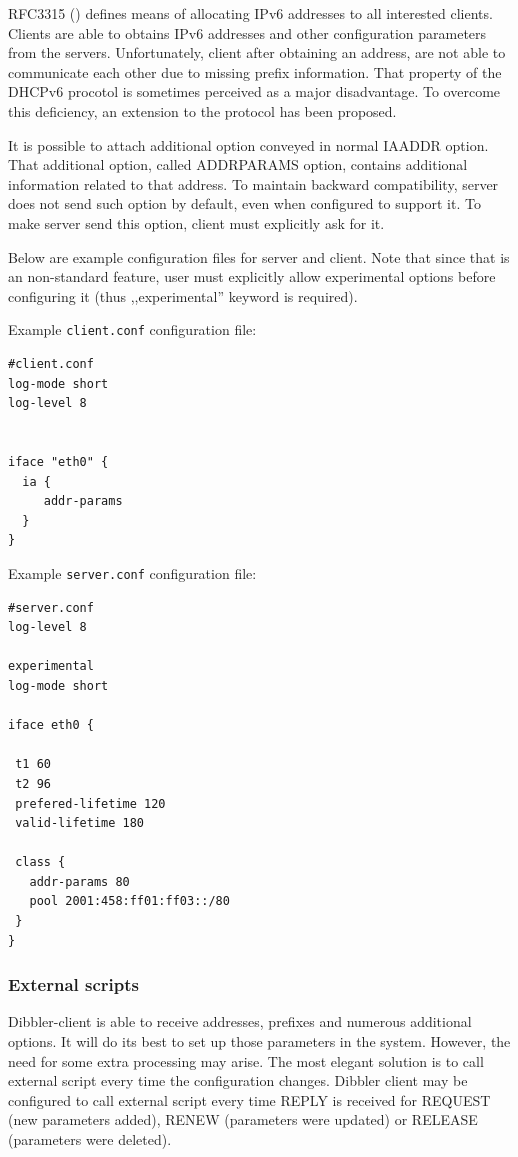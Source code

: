 RFC3315 (\cite{rfc3315}) defines means of allocating IPv6 addresses to
all interested clients. Clients are able to obtains IPv6 addresses and
other configuration parameters from the servers. Unfortunately, client
after obtaining an address, are not able to communicate each other due
to missing prefix information. That property of the DHCPv6 procotol is
sometimes perceived as a major disadvantage. To overcome this
deficiency, an extension to the protocol has been proposed.

It is possible to attach additional option conveyed in normal IAADDR
option. That additional option, called ADDRPARAMS option, contains
additional information related to that address. To maintain backward
compatibility, server does not send such option by default, even when
configured to support it. To make server send this option, client must
explicitly ask for it. 

Below are example configuration files for server and client. Note that
since that is an non-standard feature, user must explicitly allow
experimental options before configuring it (thus ,,experimental''
keyword is required).

Example \verb+client.conf+ configuration file:

\begin{lstlisting}
#client.conf
log-mode short
log-level 8


iface "eth0" {
  ia { 
     addr-params 
  }
}
\end{lstlisting}

Example \verb+server.conf+ configuration file:

\begin{lstlisting}
#server.conf
log-level 8

experimental
log-mode short

iface eth0 {

 t1 60
 t2 96
 prefered-lifetime 120
 valid-lifetime 180

 class {
   addr-params 80
   pool 2001:458:ff01:ff03::/80
 }
}
\end{lstlisting}

\subsubsection{External scripts}
Dibbler-client is able to receive addresses, prefixes and numerous
additional options. It will do its best to set up those parameters in
the system. However, the need for some extra processing may arise. The
most elegant solution is to call external script every time the
configuration changes. Dibbler client may be configured to call
external script every time REPLY is received for REQUEST (new
parameters added), RENEW (parameters were updated) or RELEASE
(parameters were deleted). 

